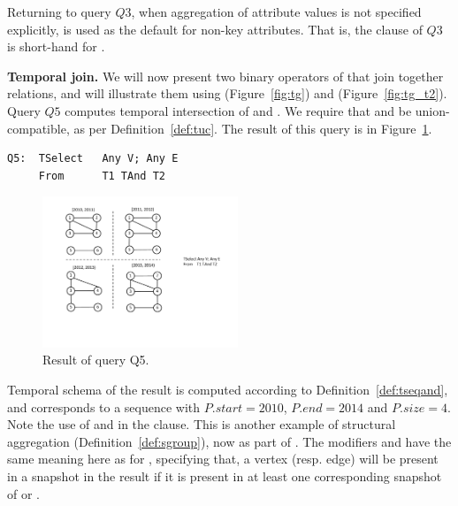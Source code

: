 Returning to query $Q3$, when aggregation of attribute values is not
specified explicitly,  is used as the default for non-key
attributes.  That is, the  clause of $Q3$ is short-hand
for  
.


{\bf Temporal join.} We will now present two binary operators of \ql
that join together \tg relations, and will illustrate them using
 (Figure~\ref{fig:tg}) and 
(Figure~\ref{fig:tg_t2}).  Query $Q5$ computes temporal intersection
of  and .  We require that  and
 be union-compatible, as per Definition~\ref{def:tuc}.  The
result of this query is in Figure~\ref{fig:q5}. 

\begin{small}
\begin{verbatim}
Q5:  TSelect   Any V; Any E
     From      T1 TAnd T2
\end{verbatim}
\end{small}

\begin{figure}
\centering
\includegraphics[width=2.3in]{figs/q5.pdf}
\caption{Result of query Q5.}
\label{fig:q5}
\end{figure}

Temporal schema of the result is computed according to
Definition~\ref{def:tseqand}, and corresponds to a sequence with
$P.start = 2010$, $P.end=2014$ and $P.size=4$.  Note the use of
 and  in the  clause.  This
is another example of structural aggregation
(Definition~\ref{def:sgroup}), now as part of .  The
modifiers  and  have the same meaning here as
for , specifying that, a vertex (resp. edge) will be
present in a snapshot in the result if it is present in at least one
corresponding snapshot of  or .  

